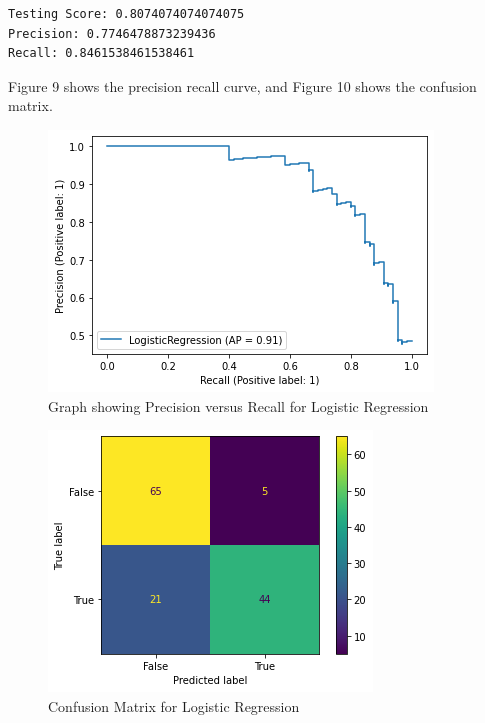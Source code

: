 \documentclass[conference]{IEEEtran}
\begin{document}
\begin{enumerate}
\begin{verbatim}
Testing Score: 0.8074074074074075
Precision: 0.7746478873239436
Recall: 0.8461538461538461
\end{verbatim}
Figure 9 shows the precision recall curve, and Figure 10 shows the confusion matrix. 
\begin{figure}[htbp]
\centerline{\includegraphics[width = \linewidth]{LR}}
\label{fig9}
\caption{Graph showing Precision versus Recall for Logistic Regression}
\end{figure}
\begin{figure}[htbp]
\centerline{\includegraphics[width = \linewidth]{CM_LR}}
\label{fig10}
\caption{Confusion Matrix for Logistic Regression}
\end{figure}
\end{enumerate}
\end{document}
